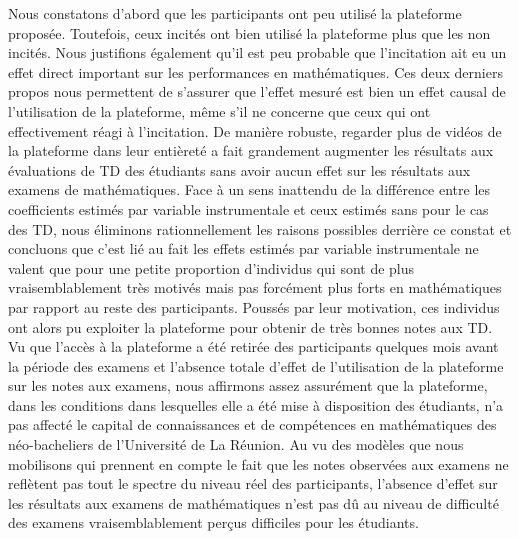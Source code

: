 \documentclass[
]{book}
\begin{document}
\quad Nous constatons d'abord que les participants ont peu utilisé la plateforme proposée. Toutefois, ceux incités ont bien utilisé la plateforme plus que les non incités. Nous justifions également qu'il est peu probable que l'incitation ait eu un effet direct important sur les performances en mathématiques. Ces deux derniers propos nous permettent de s'assurer que l'effet mesuré est bien un effet causal de l'utilisation de la plateforme, même s'il ne concerne que ceux qui ont effectivement réagi à l'incitation.
De manière robuste, regarder plus de vidéos de la plateforme dans leur entièreté a fait grandement augmenter les résultats aux évaluations de TD des étudiants sans avoir aucun effet sur les résultats aux examens de mathématiques. Face à un sens inattendu de la différence entre les coefficients estimés par variable instrumentale et ceux estimés sans pour le cas des TD, nous éliminons rationnellement les raisons possibles derrière ce constat et concluons que c'est lié au fait les effets estimés par variable instrumentale ne valent que pour une petite proportion d'individus qui sont de plus vraisemblablement très motivés mais pas forcément plus forts en mathématiques par rapport au reste des participants. Poussés par leur motivation, ces individus ont alors pu exploiter la plateforme pour obtenir de très bonnes notes aux TD. Vu que l'accès à la plateforme a été retirée des participants quelques mois avant la période des examens et l'absence totale d'effet de l'utilisation de la plateforme sur les notes aux examens, nous affirmons assez assurément que la plateforme, dans les conditions dans lesquelles elle a été mise à disposition des étudiants, n'a pas affecté le capital de connaissances et de compétences en mathématiques des néo-bacheliers de l'Université de La Réunion. Au vu des modèles que nous mobilisons qui prennent en compte le fait que les notes observées aux examens ne reflètent pas tout le spectre du niveau réel des participants, l'absence d'effet sur les résultats aux examens de mathématiques n'est pas dû au niveau de difficulté des examens vraisemblablement perçus difficiles pour les étudiants.
\end{document}

